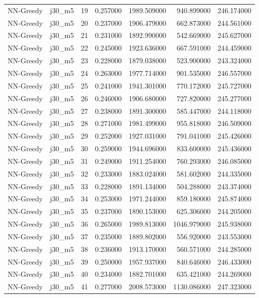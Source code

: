 \begin{tabular}{llrrrrr}
NN-Greedy & j30_m5 & 19 & 0.257000 & 1989.509000 & 940.899000 & 246.174000 \\
NN-Greedy & j30_m5 & 20 & 0.237000 & 1906.479000 & 662.873000 & 244.561000 \\
NN-Greedy & j30_m5 & 21 & 0.231000 & 1892.990000 & 542.669000 & 245.627000 \\
NN-Greedy & j30_m5 & 22 & 0.245000 & 1923.636000 & 667.591000 & 244.459000 \\
NN-Greedy & j30_m5 & 23 & 0.228000 & 1879.038000 & 523.900000 & 243.324000 \\
NN-Greedy & j30_m5 & 24 & 0.263000 & 1977.714000 & 901.535000 & 246.557000 \\
NN-Greedy & j30_m5 & 25 & 0.241000 & 1941.301000 & 770.172000 & 245.727000 \\
NN-Greedy & j30_m5 & 26 & 0.246000 & 1906.680000 & 727.820000 & 245.277000 \\
NN-Greedy & j30_m5 & 27 & 0.238000 & 1891.300000 & 585.447000 & 244.118000 \\
NN-Greedy & j30_m5 & 28 & 0.271000 & 1981.499000 & 955.818000 & 246.509000 \\
NN-Greedy & j30_m5 & 29 & 0.252000 & 1927.031000 & 791.041000 & 245.426000 \\
NN-Greedy & j30_m5 & 30 & 0.259000 & 1944.696000 & 833.600000 & 245.436000 \\
NN-Greedy & j30_m5 & 31 & 0.249000 & 1911.254000 & 760.293000 & 246.085000 \\
NN-Greedy & j30_m5 & 32 & 0.233000 & 1883.024000 & 581.602000 & 244.335000 \\
NN-Greedy & j30_m5 & 33 & 0.228000 & 1891.134000 & 504.288000 & 243.374000 \\
NN-Greedy & j30_m5 & 34 & 0.253000 & 1971.244000 & 859.180000 & 245.874000 \\
NN-Greedy & j30_m5 & 35 & 0.237000 & 1890.153000 & 625.306000 & 244.205000 \\
NN-Greedy & j30_m5 & 36 & 0.265000 & 1989.813000 & 1046.979000 & 245.938000 \\
NN-Greedy & j30_m5 & 37 & 0.235000 & 1889.802000 & 556.920000 & 243.553000 \\
NN-Greedy & j30_m5 & 38 & 0.236000 & 1913.170000 & 560.571000 & 244.285000 \\
NN-Greedy & j30_m5 & 39 & 0.250000 & 1957.937000 & 840.646000 & 246.433000 \\
NN-Greedy & j30_m5 & 40 & 0.234000 & 1882.701000 & 635.421000 & 244.269000 \\
NN-Greedy & j30_m5 & 41 & 0.277000 & 2008.573000 & 1130.086000 & 247.323000 \\

\end{tabular}
